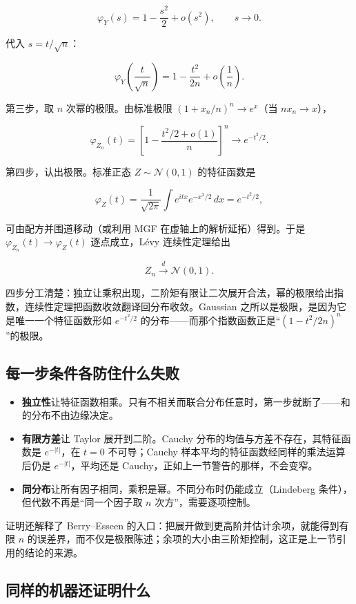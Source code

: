 \[
\varphi_Y(s)=1-\frac{s^2}{2}+o(s^2),
\qquad s\to0.
\]

代入 \(s=t/\sqrt n\)：

\[
\varphi_Y\!\left(\frac{t}{\sqrt n}\right)
=1-\frac{t^2}{2n}+o\!\left(\frac1n\right).
\]

第三步，取 \(n\) 次幂的极限。由标准极限 \((1+x_n/n)^n\to e^x\)（当 \(nx_n\to x\)），

\[
\varphi_{Z_n}(t)
=\left[1-\frac{t^2/2+o(1)}{n}\right]^n
\longrightarrow e^{-t^2/2}.
\]

第四步，认出极限。标准正态 \(Z\sim\mathcal N(0,1)\) 的特征函数是

\[
\varphi_Z(t)
=\frac1{\sqrt{2\pi}}\int e^{itx}e^{-x^2/2}\,dx
=e^{-t^2/2},
\]

可由配方并围道移动（或利用 MGF 在虚轴上的解析延拓）得到。于是 \(\varphi_{Z_n}(t)\to\varphi_Z(t)\) 逐点成立，Lévy 连续性定理给出

\[
Z_n\xrightarrow{d}\mathcal N(0,1).
\]

四步分工清楚：独立让乘积出现，二阶矩有限让二次展开合法，幂的极限给出指数，连续性定理把函数收敛翻译回分布收敛。Gaussian 之所以是极限，是因为它是唯一一个特征函数形如 \(e^{-t^2/2}\) 的分布——而那个指数函数正是``\((1-t^2/2n)^n\)''的极限。

\subsection{每一步条件各防住什么失败}

\begin{itemize}
\tightlist
\item
  \textbf{独立性}让特征函数相乘。只有不相关而联合分布任意时，第一步就断了——和的分布不由边缘决定。
\item
  \textbf{有限方差}让 Taylor 展开到二阶。Cauchy 分布的均值与方差不存在，其特征函数是 \(e^{-|t|}\)，在 \(t=0\) 不可导；Cauchy 样本平均的特征函数经同样的乘法运算后仍是 \(e^{-|t|}\)，平均还是 Cauchy，正如上一节警告的那样，不会变窄。
\item
  \textbf{同分布}让所有因子相同，乘积是幂。不同分布时仍能成立（Lindeberg 条件），但代数不再是``同一个因子取 \(n\) 次方''，需要逐项控制。
\end{itemize}

证明还解释了 Berry--Esseen 的入口：把展开做到更高阶并估计余项，就能得到有限 \(n\) 的误差界，而不仅是极限陈述；余项的大小由三阶矩控制，这正是上一节引用的结论的来源。

\subsection{同样的机器还证明什么}

